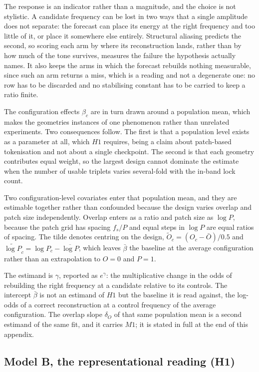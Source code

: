 The response is an indicator rather than a magnitude, and the choice is not stylistic. A candidate frequency can be lost in two ways that a single amplitude does not separate: the forecast can place its energy at the right frequency and too little of it, or place it somewhere else entirely. Structural aliasing predicts the second, so scoring each arm by where its reconstruction lands, rather than by how much of the tone survives, measures the failure the hypothesis actually names. It also keeps the arms in which the forecast rebuilds nothing measurable, since such an arm returns a miss, which is a reading and not a degenerate one: no row has to be discarded and no stabilising constant has to be carried to keep a ratio finite.

The configuration effects $\beta_c$ are in turn drawn around a population mean, which makes the geometries instances of one phenomenon rather than unrelated experiments. Two consequences follow. The first is that a population level exists as a parameter at all, which $H1$ requires, being a claim about patch-based tokenisation and not about a single checkpoint. The second is that each geometry contributes equal weight, so the largest design cannot dominate the estimate when the number of usable triplets varies several-fold with the in-band lock count.

Two configuration-level covariates enter that population mean, and they are estimable together rather than confounded because the design varies overlap and patch size independently. Overlap enters as a ratio and patch size as $\log P$, because the patch grid has spacing $f_s/P$ and equal steps in $\log P$ are equal ratios of spacing. The tilde denotes centring on the design, $\widetilde O_c=(O_c-\bar O)/0.5$ and $\widetilde{\log P}_c=\log P_c-\overline{\log P}$, which leaves $\bar\beta$ the baseline at the average configuration rather than an extrapolation to $O=0$ and $P=1$.

The estimand is $\gamma$, reported as $e^{\gamma}$: the multiplicative change in the odds of rebuilding the right frequency at a candidate relative to its controls. The intercept $\bar\beta$ is not an estimand of $H1$ but the baseline it is read against, the log-odds of a correct reconstruction at a control frequency of the average configuration. The overlap slope $\delta_O$ of that same population mean is a second estimand of the same fit, and it carries $M1$; it is stated in full at the end of this appendix.

\subsection{Model B, the representational reading (H1)}

